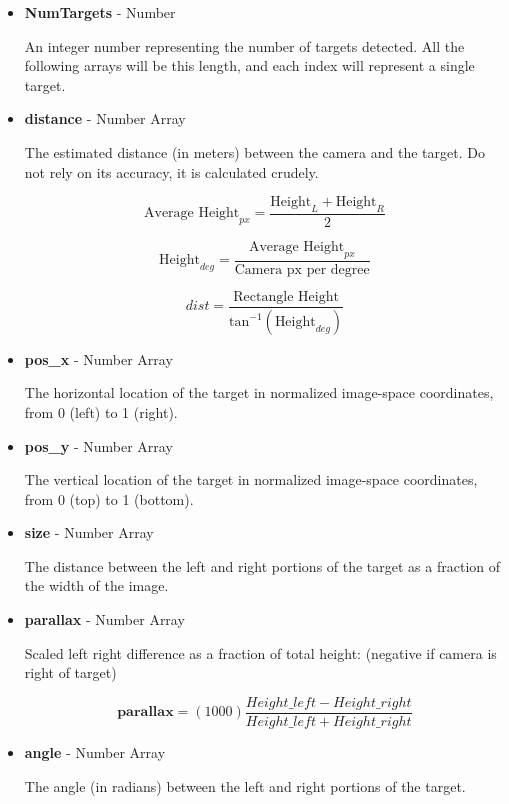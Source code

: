 \documentclass[14pt,letterpaper]{report}
\begin{document}
	\begin{itemize}[label={--}]
		\item \textbf{NumTargets} - Number
		
		An integer number representing the number of targets detected. All the following arrays will be this length, and each index will represent a single target.
		
		\item \textbf{distance} - Number Array
		
		The estimated distance (in meters) between the camera and the target. Do not rely on its accuracy, it is calculated crudely.
		
		$$ \textrm{Average Height}_{px} = \frac{\textrm{Height}_L + \textrm{Height}_R}{2} $$
		
		$$ \textrm{Height}_{deg} = \frac{\textrm{Average Height}_{px}}{\textrm{Camera px per degree}} $$
		
		$$ dist = \frac{\textrm{Rectangle Height}}{\textrm{tan}^{-1}(\textrm{Height}_{deg})} $$
		
		\item \textbf{pos\_x} - Number Array
		
		The horizontal location of the target in normalized image-space coordinates, from 0 (left) to 1 (right).
		
		\item \textbf{pos\_y} - Number Array
		
		The vertical location of the target in normalized image-space coordinates, from 0 (top) to 1 (bottom).
		
		\item \textbf{size} - Number Array
		
		The distance between the left and right portions of the target as a fraction of the width of the image.	
		
		\item \textbf{parallax} - Number Array
		
		Scaled left right difference as a fraction of total height: (negative if camera is right of target)
		
		$$ \textbf{parallax} = (1000) \frac{Height\_left-Height\_right}{Height\_left+Height\_right} $$
		 
		\item \textbf{angle} - Number Array
		
		The angle (in radians) between the left and right portions of the target.
		
	\end{itemize}
\end{document}
